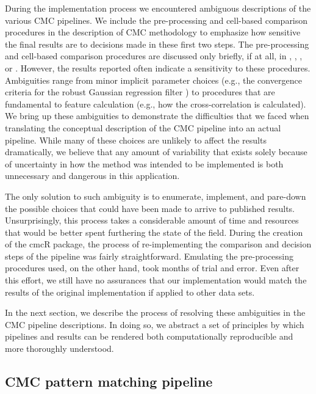 \documentclass[11pt,]{isuthesis}
\begin{document}
During the implementation process we encountered ambiguous descriptions of the various CMC pipelines.
We include the pre-processing and cell-based comparison procedures in the description of CMC methodology to emphasize how sensitive the final results are to decisions made in these first two steps.
The pre-processing and cell-based comparison procedures are discussed only briefly, if at all, in \citet{song_3d_2014}, \citet{tong_fired_2014}, \citet{tong_improved_2015}, or \citet{chen_convergence_2017}.
However, the results reported often indicate a sensitivity to these procedures.
Ambiguities range from minor implicit parameter choices (e.g., the convergence criteria for the robust Gaussian regression filter \citep{brinkman_bodschwinna_2003}) to procedures that are fundamental to feature calculation (e.g., how the cross-correlation is calculated).
We bring up these ambiguities to demonstrate the difficulties that we faced when translating the conceptual description of the CMC pipeline into an actual pipeline.
While many of these choices are unlikely to affect the results dramatically, we believe that any amount of variability that exists solely because of uncertainty in how the method was intended to be implemented is both unnecessary and dangerous in this application.

The only solution to such ambiguity is to enumerate, implement, and pare-down the possible choices that could have been made to arrive to published results.
Unsurprisingly, this process takes a considerable amount of time and resources that would be better spent furthering the state of the field.
During the creation of the cmcR package, the process of re-implementing the comparison and decision steps of the pipeline was fairly straightforward.
Emulating the pre-processing procedures used, on the other hand, took months of trial and error.
Even after this effort, we still have no assurances that our implementation would match the results of the original implementation if applied to other data sets.

In the next section, we describe the process of resolving these ambiguities in the CMC pipeline descriptions.
In doing so, we abstract a set of principles by which pipelines and results can be rendered both computationally reproducible and more thoroughly understood.

\hypertarget{investigation}{%
\subsection{CMC pattern matching pipeline}\label{investigation}}
\end{document}
